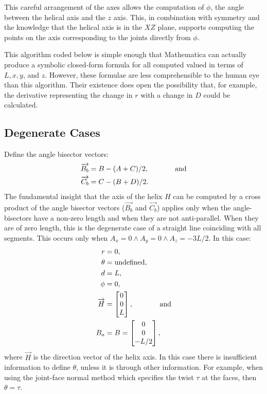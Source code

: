 \documentclass[mathematics,article,submit,pdftex,moreauthors]{Definitions/mdpi}
\begin{document}
This careful arrangement of the axes
allows the computation of $\phi$, the angle between the helical axis
and the $z$ axis. This, in combination with symmetry and the knowledge
that the helical axis is in the $XZ$ plane, supports computing the
points on the axis corresponding to the joints directly from $\phi$.

This algorithm coded below is simple enough that Mathematica \cite{Mathematica} can
actually produce a symbolic closed-form formula for all computed valued
in terms of $L, x, y$, and $z$.
However, these formulae are less comprehensible to the
human eye than this algorithm.
Their existence does open
the possibility that, for example, the derivative representing
the change in $r$ with a change in $D$ could be calculated.

\subsection{Degenerate Cases}

Define the angle bisector vectors:
\begin{align}
  \overrightarrow{B_b} &= B - (A + C)/2, \text{ \hspace{3em} and} \\
  \overrightarrow{C_b} &= C - (B + D)/2.
  \end{align}
The fundamental insight that the axis of the helix $H$ can be
computed by a cross product of the angle bisector
vectors ($\overrightarrow{B_b}$ and $\overrightarrow{C_b}$) applies only
when the angle-bisectors have a non-zero length and when
they are not anti-parallel. When they are of zero length, this is
the degenerate case of a straight line coinciding with all segments.
This occurs only when $A_x = 0 \wedge A_y = 0 \wedge A_z = -3L/2$.
In this case:
\begin{align}
  r &= 0, \\
  \theta &= \text{undefined},\\
  d &= L, \\
  \phi &= 0, \\
  \overrightarrow{H} &=  \begin{bmatrix} 0 \\ 0 \\ L  \end{bmatrix}, \text{ \hspace{3em} and} \\
  B_a &= B = \begin{bmatrix} 0 \\ 0 \\ -L/2  \end{bmatrix},
\end{align}
where $\overrightarrow{H}$ is the direction vector of the helix axis.
In this case there is insufficient information to define $\theta$,
unless it is through other information. For example, when using
the joint-face normal method which specifies
the twist $\tau$ at the faces, then $\theta = \tau$.
\end{document}
